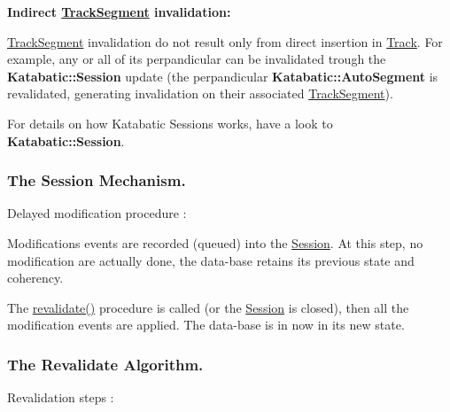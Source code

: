 {\bfseries Indirect \hyperlink{classKite_1_1TrackSegment}{Track\+Segment} invalidation\+:}
\begin{DoxyItemize}
\item \hyperlink{classKite_1_1TrackSegment}{Track\+Segment} invalidation do not result only from direct insertion in \hyperlink{classKite_1_1Track}{Track}. For example, any or all of it\textquotesingle{}s perpandicular can be invalidated trough the \textbf{ Katabatic\+::\+Session} update (the perpandicular \textbf{ Katabatic\+::\+Auto\+Segment} is revalidated, generating invalidation on their associated \hyperlink{classKite_1_1TrackSegment}{Track\+Segment}).
\end{DoxyItemize}

For details on how Katabatic Sessions works, have a look to \textbf{ Katabatic\+::\+Session}.\hypertarget{classKite_1_1Session_secSessionMechanism}{}\subsubsection{The Session Mechanism.}\label{classKite_1_1Session_secSessionMechanism}
Delayed modification procedure \+:
\begin{DoxyItemize}
\item Modifications events are recorded (queued) into the \hyperlink{classKite_1_1Session}{Session}. At this step, no modification are actually done, the data-\/base retains it\textquotesingle{}s previous state and coherency.
\item The {\ttfamily \hyperlink{classKite_1_1Session_a5bd93abe1416952ace15a98dbeeed124}{revalidate()}} procedure is called (or the \hyperlink{classKite_1_1Session}{Session} is closed), then all the modification events are applied. The data-\/base is in now in it\textquotesingle{}s new state.
\end{DoxyItemize}\hypertarget{classKite_1_1Session_secKiteSessionRevalidate}{}\subsubsection{The Revalidate Algorithm.}\label{classKite_1_1Session_secKiteSessionRevalidate}
Revalidation steps \+:
